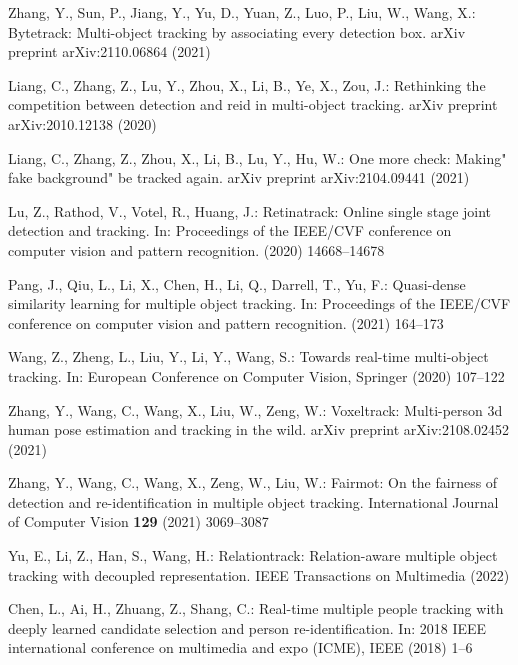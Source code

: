 \documentclass[runningheads]{llncs}
\begin{document}
\begin{thebibliography}{10}
Zhang, Y., Sun, P., Jiang, Y., Yu, D., Yuan, Z., Luo, P., Liu, W., Wang, X.:
\newblock Bytetrack: Multi-object tracking by associating every detection box.
\newblock arXiv preprint arXiv:2110.06864 (2021)

Liang, C., Zhang, Z., Lu, Y., Zhou, X., Li, B., Ye, X., Zou, J.:
\newblock Rethinking the competition between detection and reid in multi-object
  tracking.
\newblock arXiv preprint arXiv:2010.12138 (2020)

Liang, C., Zhang, Z., Zhou, X., Li, B., Lu, Y., Hu, W.:
\newblock One more check: Making" fake background" be tracked again.
\newblock arXiv preprint arXiv:2104.09441 (2021)

Lu, Z., Rathod, V., Votel, R., Huang, J.:
\newblock Retinatrack: Online single stage joint detection and tracking.
\newblock In: Proceedings of the IEEE/CVF conference on computer vision and
  pattern recognition. (2020)  14668--14678

Pang, J., Qiu, L., Li, X., Chen, H., Li, Q., Darrell, T., Yu, F.:
\newblock Quasi-dense similarity learning for multiple object tracking.
\newblock In: Proceedings of the IEEE/CVF conference on computer vision and
  pattern recognition. (2021)  164--173

Wang, Z., Zheng, L., Liu, Y., Li, Y., Wang, S.:
\newblock Towards real-time multi-object tracking.
\newblock In: European Conference on Computer Vision, Springer (2020)  107--122

Zhang, Y., Wang, C., Wang, X., Liu, W., Zeng, W.:
\newblock Voxeltrack: Multi-person 3d human pose estimation and tracking in the
  wild.
\newblock arXiv preprint arXiv:2108.02452 (2021)

Zhang, Y., Wang, C., Wang, X., Zeng, W., Liu, W.:
\newblock Fairmot: On the fairness of detection and re-identification in
  multiple object tracking.
\newblock International Journal of Computer Vision \textbf{129} (2021)
  3069--3087

Yu, E., Li, Z., Han, S., Wang, H.:
\newblock Relationtrack: Relation-aware multiple object tracking with decoupled
  representation.
\newblock IEEE Transactions on Multimedia (2022)

Chen, L., Ai, H., Zhuang, Z., Shang, C.:
\newblock Real-time multiple people tracking with deeply learned candidate
  selection and person re-identification.
\newblock In: 2018 IEEE international conference on multimedia and expo (ICME),
  IEEE (2018)  1--6


\end{thebibliography}
\end{document}
